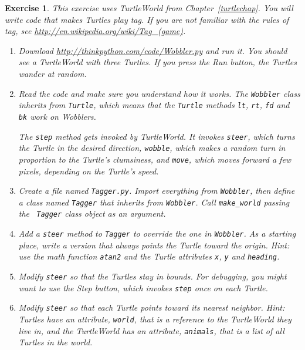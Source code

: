 \documentclass[12pt,a4paper,final,twoside,onecolumn,titlepage]{book}
\newtheorem{exercise}{Exercise}[chapter]
\begin{document}
\begin{exercise}

This exercise uses TurtleWorld from Chapter~\ref{turtlechap}.
You will write code that makes Turtles play tag.  If you
are not familiar with the rules of tag, see
\url{http://en.wikipedia.org/wiki/Tag_(game)}.

\begin{enumerate}

\item Download \url{http://thinkpython.com/code/Wobbler.py} and run it.  You
should see a TurtleWorld with three Turtles.  If you press the
{\sf Run} button, the Turtles wander at random.

\item Read the code and make sure you understand how it works.
The {\tt Wobbler} class inherits from {\tt Turtle}, which means
that the {\tt Turtle} methods {\tt lt}, {\tt rt}, {\tt fd}
and {\tt bk} work on Wobblers.

The {\tt step} method gets invoked by TurtleWorld.  It invokes 
{\tt steer}, which turns the Turtle in the desired direction,
{\tt wobble}, which makes a random turn in proportion to the Turtle's
clumsiness, and {\tt move}, which moves forward a few pixels,
depending on the Turtle's speed.

\item Create a file named {\tt Tagger.py}.  Import everything from
  {\tt Wobbler}, then define a class named {\tt Tagger} that inherits
  from {\tt Wobbler}.  Call \verb"make_world" passing the {\tt
    Tagger} class object as an argument.

\item Add a {\tt steer} method to {\tt Tagger} to override the one in
  {\tt Wobbler}.  As a starting place, write a version that always
  points the Turtle toward the origin.  Hint: use the math function
  {\tt atan2} and the Turtle attributes {\tt x}, {\tt y} and
  {\tt heading}.

\item Modify {\tt steer} so that the Turtles stay in bounds.
  For debugging, you might want to use the {\sf Step} button,
  which invokes {\tt step} once on each Turtle.

\item Modify {\tt steer} so that each Turtle points toward its nearest
  neighbor.  Hint: Turtles have an attribute, {\tt world}, that is a
  reference to the TurtleWorld they live in, and the TurtleWorld has
  an attribute, {\tt animals}, that is a list of all Turtles in the
  world.


\end{enumerate}
\end{exercise}
\end{document}
